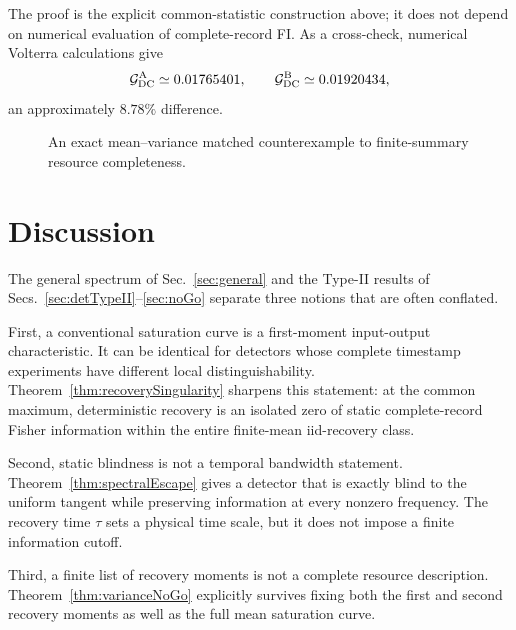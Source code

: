 \documentclass[aps,prapplied,preprint,nofootinbib]{revtex4-2}
\newcommand{\GDC}{\mathcal G_{\rm DC}}
\begin{document}
The proof is the explicit common-statistic construction above; it does not depend on numerical evaluation of complete-record FI. As a cross-check, numerical Volterra calculations give
\begin{equation}
\GDC^{\rm A}\simeq0.01765401,
\qquad
\GDC^{\rm B}\simeq0.01920434,
\end{equation}
an approximately $8.78\%$ difference.

\begin{figure}[t]
\centering
{}
\caption{An exact mean--variance matched counterexample to finite-summary resource completeness.}
\label{fig:varianceNoGo}
\end{figure}

\section{Discussion}

The general spectrum of Sec.~\ref{sec:general} and the Type-II results of Secs.~\ref{sec:detTypeII}--\ref{sec:noGo} separate three notions that are often conflated.

First, a conventional saturation curve is a first-moment input-output characteristic. It can be identical for detectors whose complete timestamp experiments have different local distinguishability. Theorem~\ref{thm:recoverySingularity} sharpens this statement: at the common maximum, deterministic recovery is an isolated zero of static complete-record Fisher information within the entire finite-mean iid-recovery class.

Second, static blindness is not a temporal bandwidth statement. Theorem~\ref{thm:spectralEscape} gives a detector that is exactly blind to the uniform tangent while preserving information at every nonzero frequency. The recovery time $\tau$ sets a physical time scale, but it does not impose a finite information cutoff.

Third, a finite list of recovery moments is not a complete resource description. Theorem~\ref{thm:varianceNoGo} explicitly survives fixing both the first and second recovery moments as well as the full mean saturation curve.
\end{document}
